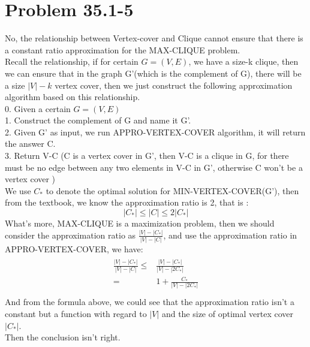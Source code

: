\documentclass[oneside]{homework} %
\begin{document}
\maketitle
\newpage
\section {Problem 35.1-5} 
No, the relationship between Vertex-cover and Clique cannot ensure that there is a constant ratio approximation for the MAX-CLIQUE problem. \\
Recall the relationship, if for certain $G=(V,E)$, we have a size-k clique, then we can ensure that in the graph G'(which is the complement of G), there will be a size $|V|-k$ vertex cover, then we just construct the following approximation algorithm based on this relationship.\\
0. Given a certain $G=(V,E)$ \\
1. Construct the complement of G and name it G'.\\
2. Given G' as input, we run APPRO-VERTEX-COVER algorithm, it will return the answer C. \\
3. Return V-C (C is a vertex cover in G', then V-C is a clique in G, for there must be no edge between any two elements in V-C in G', otherwise C won't be a vertex cover )\\


We use $C_{*}$ to denote the optimal solution for MIN-VERTEX-COVER(G'), then from the textbook, we know the approximation ratio is 2, that is : 
$$|C_{*}| \leq |C| \leq 2|C_{*}|$$
What's more, MAX-CLIQUE is a maximization problem, then we should consider the approximation ratio as $\frac{|V|-|C_{*}|}{|V|-|C|}$, and use the approximation ratio in APPRO-VERTEX-COVER, we have:
\begin{eqnarray*}
  \begin{split}
	\frac{|V|-|C_{*}|}{|V|-|C|} \leq & \frac{|V|-|C_{*}|}{|V|-|2C_{*}|} \\
	 = & 1 + \frac{C_{*}}{|V|-|2C_{*}|} \\
  \end{split}
\end{eqnarray*}
And from the formula above, we could see that the approximation ratio isn't a constant but a function with regard to $|V|$ and the size of optimal vertex cover $|C_{*}|$. \\
Then the conclusion isn't right.
\end{document}
